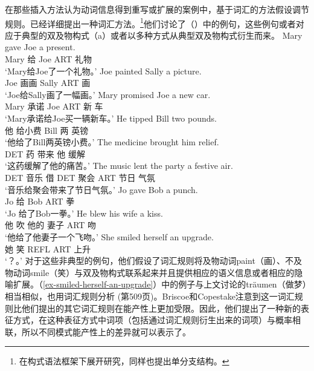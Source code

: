     在那些插入方法认为动词信息得到重写或扩展的案例中，基于词汇的方法假设调节规则。\citet[\S~4]{BC99a}已经详细提出一种词汇方法。\footnote{\citet{Kay2005a}在构式语法框架下展开研究，同样也提出单分支结构。}他们讨论了（）中的例句，这些例句或者对应于典型的双及物构式（a）或者以多种方式从典型双及物构式衍生而来。
\eal
\ex 
\gll Mary gave Joe a present.\\
Mary 给 Joe ART 礼物\\
\glt `Mary给Joe了一个礼物。'  
\ex\label{paint} 
\gll Joe painted Sally a picture.\\
Joe 画画 Sally ART 画\\
\glt `Joe给Sally画了一幅画。'  
\ex 
\gll Mary promised Joe a new car.\\
Mary 承诺 Joe ART 新 车\\
\glt `Mary承诺给Joe买一辆新车。'  
\ex 
\gll He tipped Bill two pounds.\\
他 给小费 Bill 两 英镑\\
\glt `他给了Bill两英镑小费。'  
\ex 
\gll The medicine brought him relief.\\
DET 药 带来 他 缓解\\
\glt `这药缓解了他的痛苦。'  
\ex 
\gll The music lent the party a festive air.\\
DET 音乐 借 DET 聚会 ART 节日 气氛\\
\glt `音乐给聚会带来了节日气氛。'  
\ex 
\gll Jo gave Bob a punch.\\
Jo 给 Bob ART 拳\\
\glt `Jo 给了Bob一拳。'  
\ex 
\gll He blew his wife a kiss.\\
他 吹 他的 妻子 ART 吻\\
\glt `他给了他妻子一个飞吻。'  
\ex\label{ex-smiled-herself-an-upgrade} 
\gll She smiled herself an upgrade.\\
她 笑 REFL ART 上升\\
\glt `？。'  
\zl
对于这些非典型的例句，他们假设了词汇规则将及物动词paint（画）、不及物动词smile（笑）与双及物构式联系起来并且提供相应的语义信息或者相应的隐喻扩展。（\ref{ex-smiled-herself-an-upgrade}）中的例子与上文讨论的träumen（做梦）相当相似，也用词汇规则分析 (第509页)。Briscoe和Copestake注意到这一词汇规则比他们提出的其它词汇规则在能产性上更加受限。因此，他们提出了一种新的表征方式，在这种表征方式中词项（包括通过词汇规则衍生出来的词项）与概率相联，所以不同模式能产性上的差异就可以表示了。
